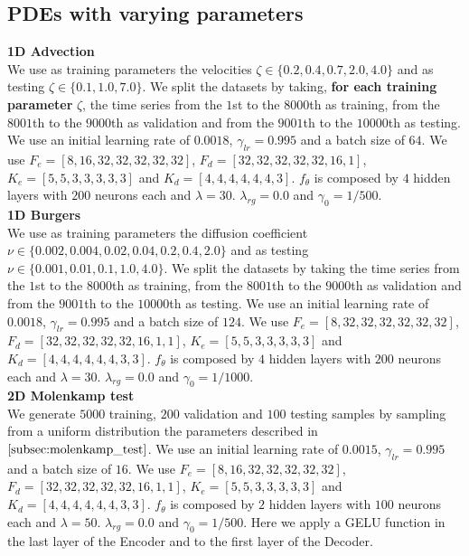 \subsection{PDEs with varying parameters}
\textbf{1D Advection}\\
We use as training parameters the velocities $\zeta\in\{0.2,0.4,0.7,2.0,4.0\}$ and as testing $\zeta\in\{0.1,1.0,7.0\}$. We split the datasets  by taking, \textbf{for each training parameter} $\zeta$, the time series from the $1$st to the $8000$th as training, from the $8001$th to the $9000$th as validation and from the $9001$th to the $10000$th as testing. We use an initial learning rate of $0.0018$, $\gamma_{lr} = 0.995$ and a batch size of $64$. We use $F_e =[8,16,32,32,32,32,32]$, $F_d =[32,32,32,32,32,16,1]$, $K_e = [5,5,3,3,3,3,3]$ and  $K_d = [4,4,4,4,4,4,3]$. $f_\theta$ is composed by $4$ hidden layers with $200$ neurons each and $\lambda=30$. $\lambda_{rg} = 0.0$ and $\gamma_0=1/500$.\\
\textbf{1D Burgers}\\
We use as training parameters the diffusion coefficient $\nu\in\{0.002,0.004,0.02,0.04,0.2,0.4,2.0\}$ and as testing $\nu\in\{0.001,0.01,0.1,1.0,4.0\}$. We split the datasets  by taking the time series from the $1$st to the $8000$th as training, from the $8001$th to the $9000$th as validation and from the $9001$th to the $10000$th as testing. We use an initial learning rate of $0.0018$, $\gamma_{lr} = 0.995$ and a batch size of $124$. We use $F_e =[8,32,32,32,32,32,32]$, $F_d =[32,32,32,32,32,16,1,1]$, $K_e = [5,5,3,3,3,3,3]$ and  $K_d = [4,4,4,4,4,4,3,3]$. $f_\theta$ is composed by $4$ hidden layers with $200$ neurons each and $\lambda=30$. $\lambda_{rg} = 0.0$ and $\gamma_0=1/1000$.
\\
\textbf{2D Molenkamp test}\\
We generate $5000$ training, $200$ validation and $100$ testing samples by sampling from a uniform distribution the parameters described in $\ref{subsec:molenkamp_test}$. We use an initial learning rate of $0.0015$, $\gamma_{lr} = 0.995$ and a batch size of $16$. We use $F_e =[8, 16, 32, 32, 32, 32, 32]$, $F_d =[32, 32, 32, 32, 32, 16, 1, 1]$, $K_e = [5, 5, 3, 3, 3, 3, 3]$ and  $K_d = [4, 4, 4, 4, 4, 4, 3, 3]$. $f_\theta$ is composed by $2$ hidden layers with $100$ neurons each and $\lambda=50$. $\lambda_{rg} = 0.0$ and $\gamma_0=1/500$. Here we apply a GELU function  in the last layer of the Encoder and to the first layer of the Decoder. 
